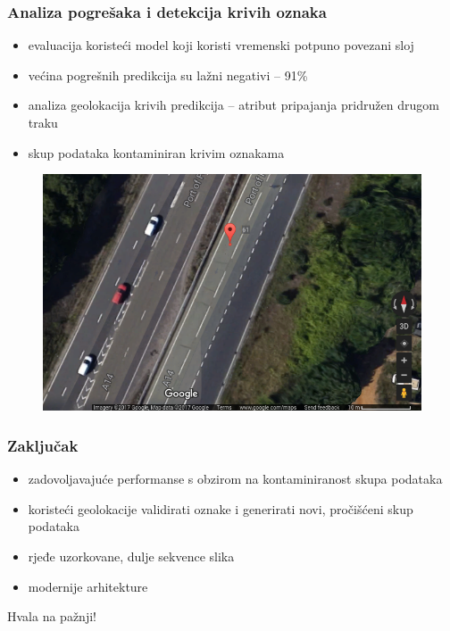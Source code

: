 \documentclass{beamer}
\begin{document}
\begin{frame}
 \frametitle{Analiza pogrešaka i detekcija krivih oznaka}
 \begin{itemize}
  \item evaluacija koristeći model koji koristi vremenski potpuno povezani sloj
  \item većina pogrešnih predikcija su lažni negativi -- 91\%
  \item analiza geolokacija krivih predikcija -- atribut pripajanja pridružen drugom traku
  \item skup podataka kontaminiran krivim oznakama
 \end{itemize}
 
  \begin{figure}[H]
\centering
\includegraphics[scale=0.25]{images/wrong_lane_label.png}
\end{figure} 

\end{frame}

\begin{frame}
\frametitle{Zaključak}
 \begin{itemize}
  \item zadovoljavajuće performanse s obzirom na kontaminiranost skupa podataka
  \item koristeći geolokacije validirati oznake i generirati novi, pročišćeni skup podataka
  \item rjeđe uzorkovane, dulje sekvence slika
  \item modernije arhitekture
 \end{itemize}

\end{frame}

\begin{frame}
\Huge{\centerline{Hvala na pažnji!}}
\end{frame}
\end{document}
